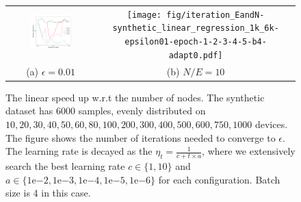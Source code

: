 \begin{figure}
\centering
\begin{tabular}{cc}
\includegraphics[width=0.5\textwidth]{fig/synthetic_linear_regression_1k_6k-epsilon001-logTrue-epoch-1-2-3-4-b4-adapt0.pdf} & 
\texttt{[image: fig/iteration\_EandN-synthetic\_linear\_regression\_1k\_6k-epsilon01-epoch-1-2-3-4-5-b4-adapt0.pdf]} 
 \\
(a) $\epsilon=0.01$  & (b) $N/E = 10$ 
\end{tabular}
	\caption{The linear speed up w.r.t the number of nodes. The synthetic dataset has $6000$ samples, evenly distributed on $10, 20, 30, 40, 50, 60, 80, 100, 200, 300, 400, 500, 600, 750, 1000$ devices. The figure shows the number of iterations needed to converge to $\epsilon$. The learning rate is decayed as the $\eta_t = \frac{1}{c + t \times a}$, where we extensively search the best learning rate $c \in \{1, 10\}$ and $a \in \{1\mathrm{e}{-2}, 1\mathrm{e}{-3}, 1\mathrm{e}{-4}, 1\mathrm{e}{-5}, 1\mathrm{e}{-6}\}$ for each configuration. Batch size is 4 in this case.}
\end{figure}


